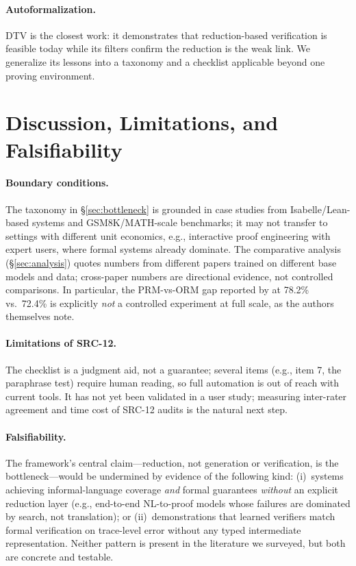 \documentclass[11pt,a4paper]{article}
\begin{document}
\paragraph{Autoformalization.} DTV \citep{zhou2024dtv} is the closest work: it demonstrates that reduction-based verification is feasible today while its filters confirm the reduction is the weak link. We generalize its lessons into a taxonomy and a checklist applicable beyond one proving environment.

\section{Discussion, Limitations, and Falsifiability}\label{sec:limits}

\paragraph{Boundary conditions.} The taxonomy in \S\ref{sec:bottleneck} is grounded in case studies from Isabelle/Lean-based systems and GSM8K/MATH-scale benchmarks; it may not transfer to settings with different unit economics, e.g., interactive proof engineering with expert users, where formal systems already dominate. The comparative analysis (\S\ref{sec:analysis}) quotes numbers from different papers trained on different base models and data; cross-paper numbers are directional evidence, not controlled comparisons. In particular, the PRM-vs-ORM gap reported by \citet{lightman2024verify} at 78.2\% vs.\ 72.4\% is explicitly \emph{not} a controlled experiment at full scale, as the authors themselves note.

\paragraph{Limitations of SRC-12.} The checklist is a judgment aid, not a guarantee; several items (e.g., item 7, the paraphrase test) require human reading, so full automation is out of reach with current tools. It has not yet been validated in a user study; measuring inter-rater agreement and time cost of SRC-12 audits is the natural next step.

\paragraph{Falsifiability.} The framework's central claim---reduction, not generation or verification, is the bottleneck---would be undermined by evidence of the following kind: (i)~systems achieving informal-language coverage \emph{and} formal guarantees \emph{without} an explicit reduction layer (e.g., end-to-end NL-to-proof models whose failures are dominated by search, not translation); or (ii)~demonstrations that learned verifiers match formal verification on trace-level error without any typed intermediate representation. Neither pattern is present in the literature we surveyed, but both are concrete and testable.
\end{document}
